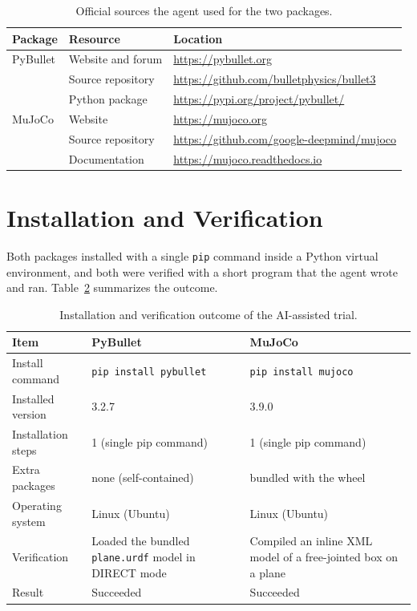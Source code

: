 \begin{table}[H]
\centering
\caption{Official sources the agent used for the two packages.}
\label{tab:ai-pilot-sources}
\small
\begin{tabular}{@{}p{2.6cm}p{3.8cm}p{6.2cm}@{}}
\toprule
\textbf{Package} & \textbf{Resource} & \textbf{Location} \\
\midrule
PyBullet & Website and forum  & \url{https://pybullet.org} \\
         & Source repository  & \url{https://github.com/bulletphysics/bullet3} \\
         & Python package     & \url{https://pypi.org/project/pybullet/} \\
\midrule
MuJoCo   & Website            & \url{https://mujoco.org} \\
         & Source repository  & \url{https://github.com/google-deepmind/mujoco} \\
         & Documentation      & \url{https://mujoco.readthedocs.io} \\
\bottomrule
\end{tabular}
\end{table}

\section*{Installation and Verification}

Both packages installed with a single \texttt{pip} command inside a Python
virtual environment, and both were verified with a short program that the agent
wrote and ran. Table~\ref{tab:ai-pilot-outcome} summarizes the outcome.

\begin{table}[H]
\centering
\caption{Installation and verification outcome of the AI-assisted trial.}
\label{tab:ai-pilot-outcome}
\small
\begin{tabular}{@{}p{3.1cm}p{4.7cm}p{4.7cm}@{}}
\toprule
\textbf{Item} & \textbf{PyBullet} & \textbf{MuJoCo} \\
\midrule
Install command     & \texttt{pip install pybullet} & \texttt{pip install mujoco} \\
Installed version   & 3.2.7 & 3.9.0 \\
Installation steps  & 1 (single pip command) & 1 (single pip command) \\
Extra packages      & none (self-contained) & bundled with the wheel \\
Operating system    & Linux (Ubuntu) & Linux (Ubuntu) \\
Verification        & Loaded the bundled \texttt{plane.urdf} model in DIRECT mode & Compiled an inline XML model of a free-jointed box on a plane \\
Result              & Succeeded & Succeeded \\
\bottomrule
\end{tabular}
\end{table}

